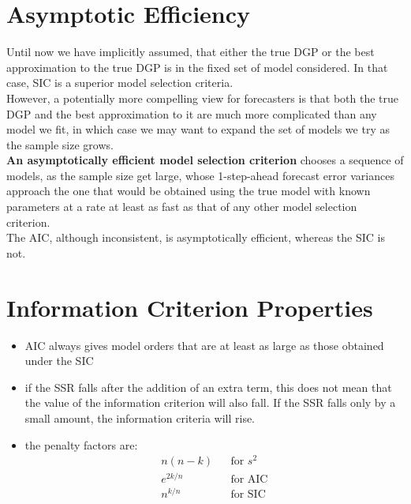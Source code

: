 \section{Asymptotic Efficiency}
Until now we have implicitly assumed, that either the true DGP or the best approximation to the true DGP is in the fixed set of model considered. In that case, SIC is a superior model selection criteria.\\
However, a potentially more compelling view for forecasters is that both the true DGP and the best approximation to it are much more complicated than any model we fit, in which case we may want to expand the set of models we try as the sample size grows.\\
\textbf{\color{blue}An asymptotically efficient model selection criterion} chooses a sequence of models, as the sample size get large, whose 1-step-ahead forecast error variances approach the one that would be obtained using the true model with known parameters at a rate at least as fast as that of any other model selection criterion.\\
The AIC, although inconsistent, is asymptotically efficient, whereas the SIC is not.

\section{Information Criterion Properties}
\begin{itemize}
	\item AIC always gives model orders that are at least as large as those obtained under the SIC
	\item if the SSR falls after the addition of an extra term, this does not mean that the value of the information criterion will also fall. If the SSR falls only by a small amount, the information criteria will rise.
	\item the penalty factors are:
	\begin{eqnarray}
		n(n - k)&&\text{for $s^{2}$}\\
		e^{2k / n}&&\text{for AIC}\\
		n^{k / n}&&\text{for SIC}
	\end{eqnarray}
\end{itemize}



